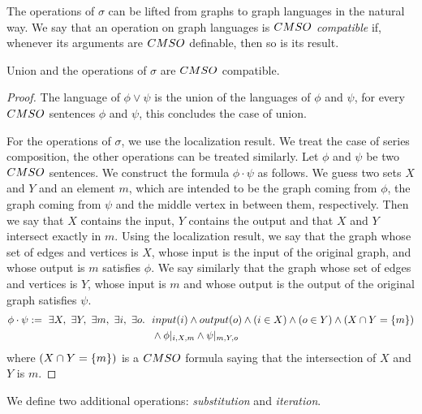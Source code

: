 The operations of $\sigma$ can be lifted from graphs to graph languages in the natural way. We say that an operation on graph languages is \emph{$\CMSO$ compatible} if, whenever its arguments are $\CMSO$ definable, then so is its result. 

\begin{proposition}\label{prop:CMSO-def-operations}
Union and the operations of $\sigma$ are $\CMSO$ compatible.
\end{proposition}
\begin{proof}
The language of $\phi  \vee \psi$ is the union of the languages of $\phi$ and $\psi$, for every $\CMSO$ sentences $\phi$ and $\psi$, this concludes the case of union.

For the operations of $\sigma$, we use the localization result. We treat the case of series composition, the other operations can be treated similarly. Let $\phi$ and $\psi$ be two $\CMSO$ sentences. We construct the formula $\phi\cdot\psi$ as follows. We guess two sets $X$ and $Y$ and an element $m$, which are intended to be the graph coming from $\phi$, the graph coming from $\psi$ and the middle vertex in between them, respectively. Then we say that $X$ contains the input, $Y$ contains the output and that $X$ and $Y$ intersect exactly in $m$. Using the localization result, we say that the graph whose set of edges and vertices is $X$,  whose input is the input of the original graph, and whose output is $m$ satisfies $\phi$. We say similarly that  the graph whose set of edges and vertices is $Y$, whose input is $m$ and whose output is the output of the original graph satisfies $\psi$.
\begin{align*}
\phi\cdot\psi:= \ \exists X,\ \exists Y,\ \exists m,\ \exists i,\ \exists  o.\ \ &\mathsf{input}(i)\wedge \mathsf{output}(o)\wedge (i\in X) \wedge (o\in Y) \wedge (X\cap Y=\set{m}) \\ & \wedge \phi|_{i,X, m} \wedge \psi|_{m,Y,o}
\end{align*}
where $(X\cap Y=\left\{m\right\})$ is a $\CMSO$ formula saying that the intersection of $X$ and $Y$ is  $m$. 
 \end{proof}

 We define two additional operations: \emph{substitution} and \emph{iteration}.
 
